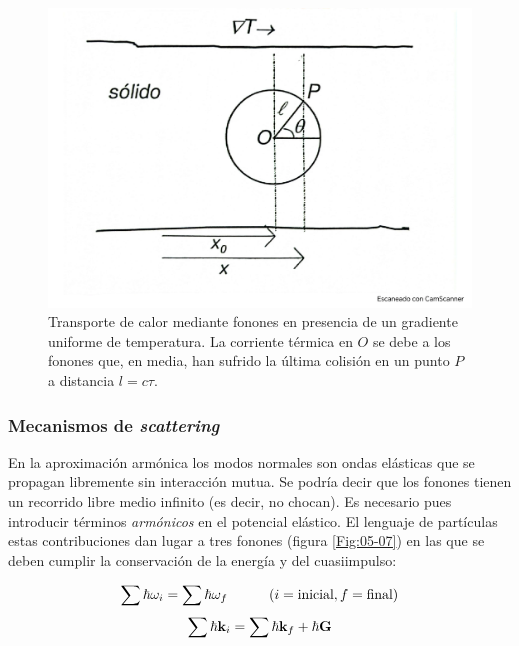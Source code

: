 \begin{figure}[h!] \centering
    \includegraphics[scale=0.25]{Cuerpo/Ch_05/Fotos libro 6.pdf}
    \caption{Transporte de calor mediante fonones en presencia de un gradiente uniforme de temperatura. La corriente térmica en $O$ se debe a los fonones que, en media, han sufrido la última colisión en un punto $P$ a distancia $l=c\tau$.}
    \label{Fig:05-06}
\end{figure}    
 
\subsubsection{Mecanismos de \textit{scattering}}

En la aproximación armónica los modos normales son ondas elásticas que se propagan libremente sin interacción mutua. Se podría decir que los fonones tienen un recorrido libre medio infinito (es decir, no chocan). Es necesario pues introducir términos \textit{armónicos} en el potencial elástico. El lenguaje de partículas estas contribuciones dan lugar a tres fonones (figura \ref{Fig:05-07}) en las que se deben cumplir la conservación de la energía y del cuasiimpulso:

\begin{equation*}
    \sum \hbar \omega_i = \sum \hbar \omega_f  \quad \quad \quad (i=\text{inicial}, f= \text{final})
\end{equation*}
\begin{equation}
    \sum \hbar \mathbf{k}_i = \sum \hbar \mathbf{k}_f + \hbar \mathbf{G}
\end{equation}

